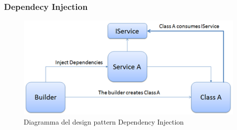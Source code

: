 \subsubsection{Dependecy Injection}

\begin{figure}[h]
\begin{center}
\includegraphics[scale=0.8]{img/dependency.png}
\caption{Diagramma del design pattern Dependency Injection}
\end{center}
\end{figure}

